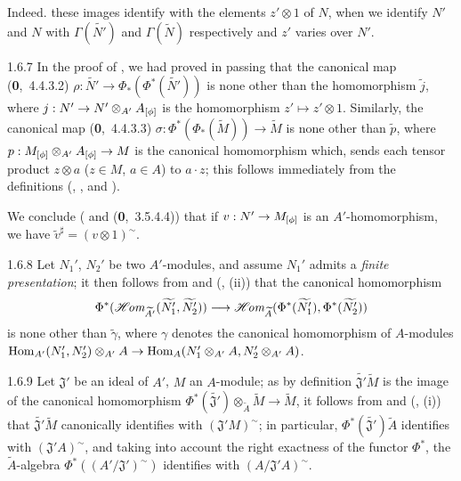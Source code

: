 Indeed. these images identify with the elements $z'\otimes 1$ of $N$, when we identify $N'$
and $N$ with $\Gamma(\widetilde{N'})$ and $\Gamma(\widetilde{N})$ respectively
 and $z'$ varies over $N'$.

\begin{env}{1.6.7}
\label{env-1.1.6.7}
In the proof of , we had proved in passing that the canonical map
(\textbf{0},~4.4.3.2) $\rho:\widetilde{N'}\to\Phi_*(\Phi^*(\widetilde{N'}))$ is none other
than the homomorphism $\widetilde{j}$,
where $j:N'\to N'\otimes_{A'}A_{[\phi]}$ is the homomorphism $z'\mapsto z'\otimes 1$.
Similarly, the canonical map (\textbf{0},~4.4.3.3)
$\sigma:\Phi^*(\Phi_*(\widetilde{M}))\to\widetilde{M}$ is none other than $\widetilde{p}$,
where $p:M_{[\phi]}\otimes_{A'}A_{[\phi]}\to M$ is the canonical homomorphism which, sends
each tensor product $z\otimes a$ ($z\in M$, $a\in A$) to $a\cdot z$; this follows immediately
from the definitions (, , and ).

We conclude ( and (\textbf{0},~3.5.4.4)) that if $v:N'\to M_{[\phi]}$ is an
$A'$-homomorphism, we have $\widetilde{v}^\sharp=(v\otimes 1)^\sim$.
\end{env}

\begin{env}{1.6.8}
\label{env-1.1.6.8}
Let $N_1'$, $N_2'$ be two $A'$-modules, and assume $N_1'$ admits a \emph{finite
presentation}; it then follows from  and (, (ii)) that the
canonical homomorphism 
\[
  \Phi^*(\mathscr{H}\!\textit{om}_{\widetilde{A'}}(\widetilde{N_1'},\widetilde{N_2'}))
  \longrightarrow\mathscr{H}\!\textit{om}_{\widetilde{A}}(\Phi^*(\widetilde{N_1'}),\Phi^*(\widetilde{N_2'}))
\]
is none other than $\widetilde{\gamma}$, where $\gamma$ denotes the canonical homomorphism
of $A$-modules
${\mathop{\mathrm{Hom}}\nolimits}_{A'}(N_1',N_2')\otimes_{A'}A\to{\mathop{\mathrm{Hom}}\nolimits}_A(N_1'\otimes_{A'}A,N_2'\otimes_{A'}A)$.
\end{env}

\begin{env}{1.6.9}
\label{env-1.1.6.9}
Let $\mathfrak{J}'$ be an ideal of $A'$, $M$ an $A$-module; as by definition
$\widetilde{\mathfrak{J}'}\widetilde{M}$ is the image of the canonical homomorphism
$\Phi^*(\widetilde{\mathfrak{J}'})\otimes_{\widetilde{A}}\widetilde{M}\to\widetilde{M}$, it
follows from  and (, (i)) that
$\widetilde{\mathfrak{J}'}\widetilde{M}$ canonically identifies with $(\mathfrak{J}'M)^\sim$;
in particular, $\Phi^*(\widetilde{\mathfrak{J}'})\widetilde{A}$ identifies with
$(\mathfrak{J}'A)^\sim$, and taking into account the right exactness of the functor $\Phi^*$,
the $\widetilde{A}$-algebra $\Phi^*((A'/\mathfrak{J}')^\sim)$ identifies with
$(A/\mathfrak{J}'A)^\sim$.
\end{env}

